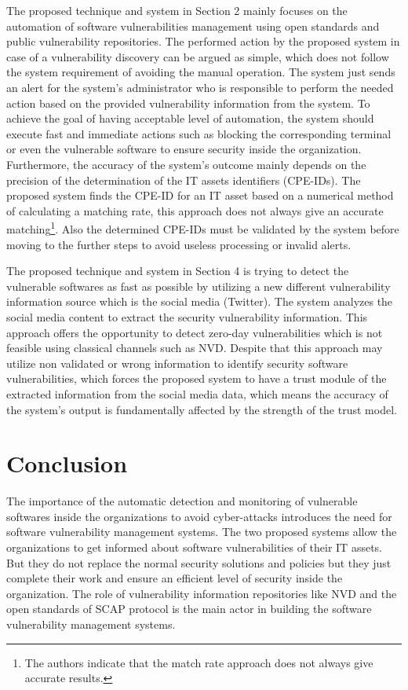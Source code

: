 \documentclass{llncs}
\begin{document}
\par The proposed technique and system in Section 2 mainly focuses on the automation of software vulnerabilities management using open standards and public vulnerability repositories. The performed action by the proposed system in case of a vulnerability discovery can be argued as simple, which does not follow the system requirement of avoiding the manual operation. The system just sends an alert for the system's administrator who is responsible to perform the needed action based on the provided vulnerability information from the system. To achieve the goal of having acceptable level of automation, the system should execute fast and immediate actions such as  blocking the corresponding terminal or even the vulnerable software  to ensure security inside the organization. Furthermore, the accuracy of the system's outcome mainly depends on the precision of the determination of the IT assets identifiers (CPE-IDs). The proposed system finds the CPE-ID for an IT asset based on a numerical method of calculating a matching rate, this approach does not always give an accurate matching\footnote{ The authors indicate that the match rate approach does not always give accurate results.}. Also the determined CPE-IDs must be validated by the system before moving to the further steps to avoid useless processing or invalid alerts.


\par The proposed technique and system in Section 4 is trying to detect the vulnerable softwares as fast as possible by utilizing a new different vulnerability information source which is the social media (Twitter). The system analyzes the social media content to extract the security vulnerability information. This approach offers the opportunity to detect zero-day vulnerabilities which is not feasible using classical channels such as NVD. Despite that this approach may utilize non validated or wrong information to  identify security software vulnerabilities, which forces the proposed system to  have a trust module of the extracted information from the social media data, which means the accuracy of the system's output is  fundamentally affected by the strength of the trust model.
 
 \newpage  
\section{Conclusion}

\par The importance of the automatic detection and monitoring of vulnerable softwares inside the organizations to avoid cyber-attacks introduces the need for software vulnerability management systems. The two proposed systems allow the organizations to get informed about software vulnerabilities of their IT assets. But they do not replace the normal security solutions and policies but they just complete their work and ensure an efficient level of security inside the organization. The role of vulnerability information repositories like NVD and the open standards of SCAP protocol is the main actor in building the software vulnerability management systems.   
\end{document}
